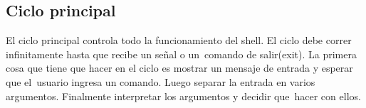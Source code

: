 \subsection{Ciclo principal}
El ciclo principal controla todo la funcionamiento del shell. El ciclo debe correr infinitamente hasta que recibe un señal o un\
comando de salir(exit). La primera cosa que tiene que hacer en el ciclo es mostrar un mensaje de entrada y esperar que el\
usuario ingresa un comando. Luego separar la entrada en varios argumentos. Finalmente interpretar los argumentos y decidir que\
hacer con ellos.
